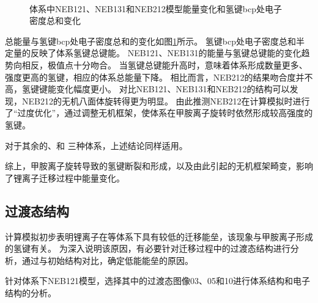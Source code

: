 \begin{figure}[htbp]
    \centering
     \\ 
    \caption{体系中NEB121、NEB131和NEB212模型能量变化和氢键bcp处电子密度总和变化}
    \label{fig:111-barrier-bcp}
\end{figure}

总能量与氢键bcp处电子密度总和的变化如图\ref{fig:111-barrier-bcp}所示。
氢键bcp处电子密度总和半定量的反映了体系氢键总键能。
NEB121、NEB131的能量与氢键总键能的变化趋势向相反，极值点十分吻合。
当氢键总键能升高时，意味着体系形成数量更多、强度更高的氢键，相应的体系总能量下降。
相比而言，NEB212的结果吻合度并不高，氢键键能变化幅度更小。
对比NEB121、NEB131和NEB212的结构可以发现，NEB212的无机八面体旋转得更为明显。
由此推测NEB212在计算模拟时进行了“过度优化”，通过调整无机框架，使体系在甲胺离子旋转时依然形成较高强度的氢键。

对于其余的、和 三种体系，上述结论同样适用。

综上，甲胺离子旋转导致的氢键断裂和形成，以及由此引起的无机框架畸变，影响了锂离子迁移过程中能量变化。

\subsection{过渡态结构}

计算模拟初步表明锂离子在等体系下具有较低的迁移能垒，该现象与甲胺离子形成的氢键有关。
为深入说明该原因，有必要针对迁移过程中的过渡态结构进行分析，通过与初始结构对比，确定低能能垒的原因。

针对体系下NEB121模型，选择其中的过渡态图像03、05和10进行体系结构和电子结构的分析。

